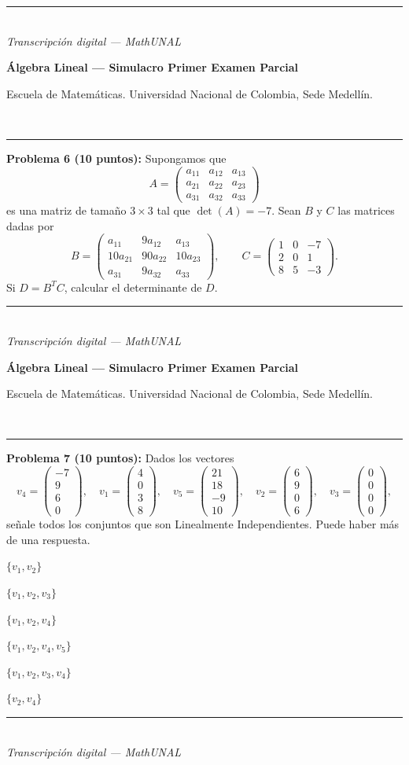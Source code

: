 \documentclass[11pt]{article}
\newcommand{\vectiv}[4]{\begin{pmatrix}#1\\#2\\#3\\#4\end{pmatrix}}
\newcommand{\examheader}{%
  \noindent
  \begin{minipage}[t]{0.6\linewidth}
    {\small\bfseries Álgebra Lineal --- Simulacro Primer Examen Parcial}\\
  \end{minipage}%
  \hfill
  \begin{minipage}[t]{0.35\linewidth}
    \raggedleft\small Escuela de Matemáticas. Universidad Nacional de Colombia, Sede Medellín.
  \end{minipage}\\[2pt]
  \rule{\linewidth}{0.6pt}
}
\newcommand{\examfooter}{%
  \vfill
  \rule{\linewidth}{0.4pt}\\[1pt]
  {\scriptsize\textit{Transcripción digital --- MathUNAL}\hfill\textcolor{unalblue}{\textbf{\thepage}}}
}
\begin{document}
\vspace{2cm}

\examfooter
\newpage

\examheader

\textbf{Problema 6 (10 puntos):} Supongamos que
\[
A = \begin{pmatrix} a_{11} & a_{12} & a_{13} \\ a_{21} & a_{22} & a_{23} \\ a_{31} & a_{32} & a_{33} \end{pmatrix}
\]
es una matriz de tamaño $3\times 3$ tal que $\det(A) = -7$. Sean $B$ y $C$ las matrices dadas por
\[
B = \begin{pmatrix} a_{11} & 9a_{12} & a_{13} \\ 10a_{21} & 90a_{22} & 10a_{23} \\ a_{31} & 9a_{32} & a_{33} \end{pmatrix}, \qquad
C = \begin{pmatrix} 1 & 0 & -7 \\ 2 & 0 & 1 \\ 8 & 5 & -3 \end{pmatrix}.
\]
Si $D = B^T C$, calcular el determinante de $D$.

\vspace{2cm}

\examfooter
\newpage

\examheader

\textbf{Problema 7 (10 puntos):} Dados los vectores
\[
v_4 = \vectiv{-7}{9}{6}{0}, \quad v_1 = \vectiv{4}{0}{3}{8}, \quad v_5 = \vectiv{21}{18}{-9}{10}, \quad v_2 = \vectiv{6}{9}{0}{6}, \quad v_3 = \vectiv{0}{0}{0}{0},
\]
señale todos los conjuntos que son Linealmente Independientes. Puede haber más de una respuesta.

\begin{opciones}
\item $\{v_1, v_2\}$
\item $\{v_1, v_2, v_3\}$
\item $\{v_1, v_2, v_4\}$
\item $\{v_1, v_2, v_4, v_5\}$
\item $\{v_1, v_2, v_3, v_4\}$
\item $\{v_2, v_4\}$
\end{opciones}

\examfooter
\end{document}
